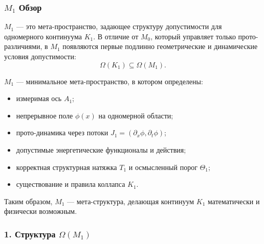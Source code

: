 

\subsubsection{\texorpdfstring{$M_1$}{M_1} Обзор}
\label{sec:m1-overview}

$M_1$ — это мета-пространство, задающее структуру допустимости для
одномерного континуума $K_1$.
В отличие от $M_0$, который управляет только прото-различиями, в $M_1$
появляются первые подлинно геометрические и динамические условия допустимости:
\[
\Omega(K_1) \subseteq \Omega(M_1).
\]

$M_1$ — минимальное мета-пространство, в котором определены:

\begin{itemize}
    \item измеримая ось $A_1$;
    \item непрерывное поле $\phi(x)$ на одномерной области;
    \item прото-динамика через потоки $J_1=(\partial_x \phi, \partial_t \phi)$;
    \item допустимые энергетические функционалы и действия;
    \item корректная структурная натяжка $T_1$ и осмысленный порог $\Theta_1$;
    \item существование и правила коллапса $K_1$.
\end{itemize}

Таким образом, $M_1$ — мета-структура, делающая континуум $K_1$
математически и физически возможным.

\subsubsection*{1. Структура \texorpdfstring{$\Omega(M_1)$}{\Omega(M_1)}}

